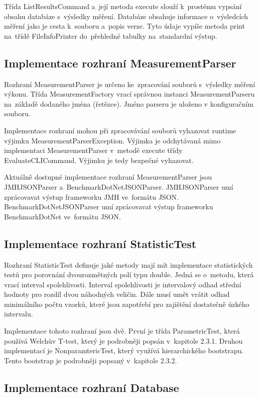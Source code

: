 Třída ListResultsCommand a~její metoda execute slouží k~prostému vypsání obsahu databáze s~výsledky měření.
Databáze obsahuje informace o~výsledcích měření jako je cesta k~souboru a~popis verze. Tyto údaje vypíše
metoda print na~třídě FileInfoPrinter do~přehledné tabulky na~standardní výstup.

\subsection{Implementace rozhraní MeasurementParser}

Rozhraní MeasurementParser je určeno ke~zpracování souborů s~výsledky měření výkonu.
Třída MeasurementFactory vrací správnou instanci MeasurementParseru na~základě dodaného jména (řetězce).
Jméno parseru je uloženo v konfiguračním souboru.

Implementace rozhraní mohou při zpracovávání souborů vyhazovat runtime výjimku
MeasurementParserException. Výjimka je odchytávaná mimo implementaci MeasurementParser
v~metodě execute třídy EvaluateCLICommand. Výjimku je tedy bezpečné vyhazovat.

Aktuálně dostupné implementace rozhraní MeasurementParser jsou JMHJSONParser a~BenchmarkDotNetJSONParser.
JMHJSONParser umí zprácovavat výstup frameworku JMH ve~formátu JSON. BenchmarkDotNetJSONParser
umí zprácovavat výstup frameworku BenchmarkDotNet ve~formátu JSON.

\subsection{Implementace rozhraní StatisticTest}

Rozhraní StatisticTest definuje jaké metody mají mít implementace statistických testů
pro porovnání dvourozmětných polí typu double. Jedná se o~metodu, která vrací interval spolehlivosti.
Interval spolehlivosti je intervalový odhad střední hodnoty pro rozdíl dvou náhodných veličin.
Dále musí umět vrátit odhad minimálního počtu vzorků, které jsou zapotřebí pro zajištění dostatečně úzkého intervalu.

Implementace tohoto rozhraní jsou dvě. První je třída ParametricTest, která používá
Welchův T-test, který je podrobněji popsán v~kapitole 2.3.1. Druhou implementací je
NonparamtericTest, který využívá hierarchického bootstrapu. Tento bootstrap je podrobněji
popsaný v~kapitole 2.3.2.

\subsection{Implementace rozhraní Database}

